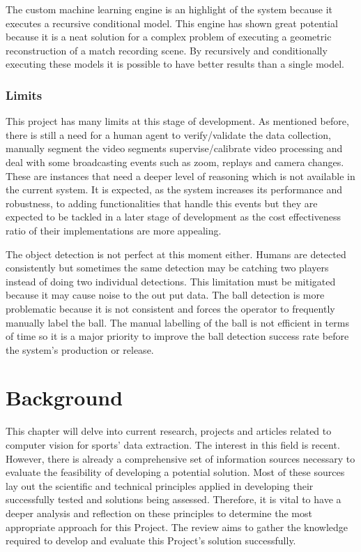 \documentclass[
    11pt,
    oneside
]{report}
\begin{document}
The custom machine learning engine is an highlight of the system because it executes a recursive conditional model. This engine has shown great potential because it is a neat solution for a complex problem of executing a geometric reconstruction of a match recording scene. By recursively and conditionally executing these models it is possible to have better results than a single model.




\subsection{Limits}


This project has many limits at this stage of development. As mentioned before, there is still a need for a human agent to verify/validate the data collection, manually segment the video segments supervise/calibrate video processing and deal with some broadcasting events such as zoom, replays and camera changes. These are instances that need a deeper level of reasoning which is not available in the current system. It is expected, as the system increases its performance and robustness, to adding functionalities that handle this events but they are expected to be tackled in a later stage of development as the cost effectiveness ratio of their implementations are more appealing.


The object detection is not perfect at this moment either. Humans are detected consistently but sometimes the same detection may be catching two players instead of doing two individual detections. This limitation must be mitigated because it may cause noise to the out put data. The ball detection is more problematic because it is not consistent and forces the operator to frequently manually label the ball. The manual labelling of the ball is not efficient in terms of time so it is a major priority to improve the ball detection success rate before the system's production or release.





\chapter{Background}


This chapter will delve into current research, projects and articles related to computer vision for sports' data extraction. The interest in this field is recent. However, there is already a comprehensive set of information sources necessary to evaluate the feasibility of developing a potential solution. Most of these sources lay out the scientific and technical principles applied in developing their successfully tested and solutions being assessed. Therefore, it is vital to have a deeper analysis and reflection on these principles to determine the most appropriate approach for this Project. The review aims to gather the knowledge required to develop and evaluate this Project's solution successfully.
\end{document}
